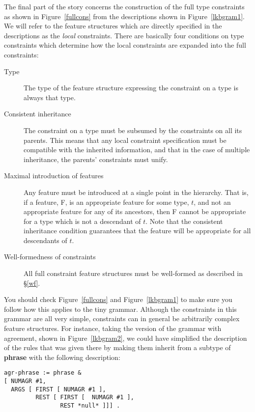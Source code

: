 \documentclass[12pt]{report}
\begin{document}
The final part of the story concerns the construction of the
full type constraints as shown in Figure~\ref{fullcons} from
the descriptions shown in Figure~\ref{lkbgram1}.
We will refer to the feature
structures which are directly specified in the descriptions
as the {\it local} constraints.
There are basically four conditions on type constraints
which determine how the local constraints are expanded into the 
full constraints:
\begin{description}
\item[Type] The type of the feature structure
expressing the constraint on a type is always that type.
\item[Consistent inheritance]
The constraint on a type must be subsumed by the constraints
on all its parents.  This means that any local constraint
specification must be compatible with the inherited
information, and that
in the case of multiple inheritance,
the parents' constraints must unify.
\item[Maximal introduction of features]
Any feature must be introduced at a single point in the hierarchy.
That is, if a feature, F, is an appropriate feature
for some type, $t$, and 
not an appropriate feature for any of its
ancestors, then F cannot be appropriate for a type which is not
a descendant of $t$.  Note that the consistent inheritance
condition guarantees that the feature will be appropriate
for all descendants of $t$.
\item[Well-formedness of constraints]  All full constraint feature
structures must be well-formed as described in
\S\ref{wf}.  
\end{description}

You should check Figure~\ref{fullcons} and Figure~\ref{lkbgram1}
to make sure you follow how this applies to the tiny grammar.
Although the constraints in this grammar are all very
simple, constraints can in general be
arbitrarily complex feature structures.  For instance,
taking the version of the grammar with agreement, shown in Figure~\ref{lkbgram2},
we could have simplified the description of the rules
that was given there by making them inherit from a subtype of {\bf phrase}
with the following description:
\begin{verbatim}
agr-phrase := phrase &
[ NUMAGR #1,
  ARGS [ FIRST [ NUMAGR #1 ],
         REST [ FIRST [  NUMAGR #1 ],
                REST *null* ]]] .
\end{verbatim}
\end{document}
